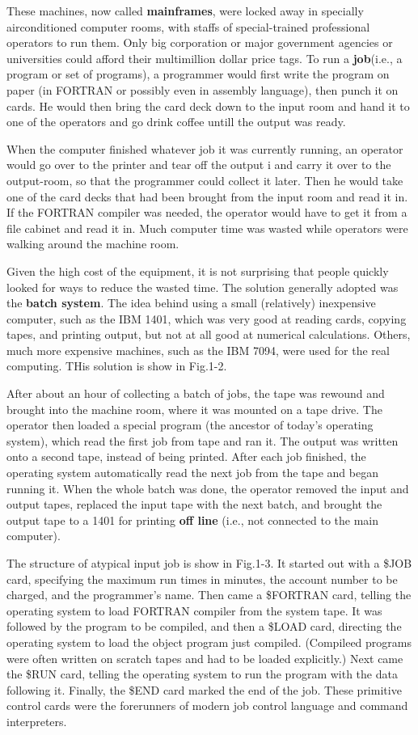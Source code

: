 \documentclass{book}
\newcommand {\kw} [1] {\textbf{#1}}
\begin{document}
These machines, now called \kw{mainframes}, were locked away in specially airconditioned computer rooms, 
with staffs of special-trained professional operators to run them.
Only big corporation or major government agencies or universities could afford their multimillion dollar price tags.
To run a \kw{job}(i.e., a program or set of programs), a programmer would first write the program on paper 
(in FORTRAN or possibly even in assembly language), then punch it on cards.
He would then bring the card deck down to the input room and hand it to one of the operators and go drink coffee untill the output was ready.

When the computer finished whatever job it was currently running, an operator would go over to the printer and tear off the output i
and carry it over to the output-room, so that the programmer could collect it later. 
Then he would take one of the card decks that had been brought from the input room and read it in.
If the FORTRAN compiler was needed, the operator would have to get it from a file cabinet and read it in.
Much computer time was wasted while operators were walking around the machine room.

Given the high cost of the equipment, it is not surprising that people quickly looked for ways to reduce the wasted time.
The solution generally adopted was the \kw{batch system}.
The idea behind using a small (relatively) inexpensive computer, such as the IBM 1401, 
which was very good at reading cards, copying tapes, and printing output, but not at all good at numerical calculations.
Others, much more expensive machines, such as the IBM 7094, were used for the real computing.
THis solution is show in Fig.1-2.

After about an hour of collecting a batch of jobs, the tape was rewound and brought into the machine room, where it was mounted on a tape drive.
The operator then loaded a special program (the ancestor of today's operating system), which read the first job from tape and ran it.
The output was written onto a second tape, instead of being printed.
After each job finished, the operating system automatically read the next job from the tape and began running it.
When the whole batch was done, the operator removed the input and output tapes, replaced the input tape with the next batch, 
and brought the output tape to a 1401 for printing \kw{off line} (i.e., not connected to the main computer).

The structure of atypical input job is show in Fig.1-3.
It started out with a \$JOB card, specifying the maximum run times in minutes, the account number to be charged, and the programmer's name.
Then came a \$FORTRAN card, telling the operating system to load FORTRAN compiler from the system tape.
It was followed by the program to be compiled, and then a \$LOAD card, directing the operating system to load the object program just compiled.
(Compileed programs were often written on scratch tapes and had to be loaded explicitly.)
Next came the \$RUN card, telling the operating system to run the program with the data following it.
Finally, the \$END card marked the end of the job.
These primitive control cards were the forerunners of modern job control language and command interpreters.
\end{document}

